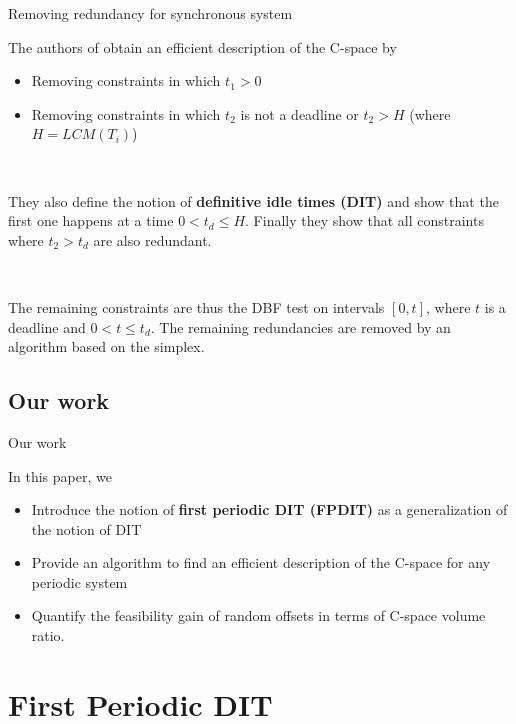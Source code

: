 \documentclass{beamer}
\begin{document}
    \begin{frame}{Removing redundancy for synchronous system}

    The authors of \cite{george2009characterization} obtain an efficient description of the C-space by
    \begin{itemize}
        \item Removing constraints in which $t_1 > 0$
        \item Removing constraints in which $t_2$ is not a deadline or $t_2 > H$ (where $H = LCM(T_i)$)
    \end{itemize}

    ~\\
    \pause

    They also define the notion of \textbf{definitive idle times (DIT)} and show that the first one happens at a time $0 < t_d \leqslant H$. Finally they show that all constraints where $t_2 > t_d$ are also redundant.

    ~\\
    \pause

    The remaining constraints are thus the DBF test on intervals $[0, t]$, where $t$ is a deadline and $0 < t \leqslant t_d$. The remaining redundancies are removed by an algorithm based on the simplex.

    \end{frame}

	\subsection{Our work}

	\begin{frame}{Our work}

	In this paper, we
    \begin{itemize}
        \item Introduce the notion of \textbf{first periodic DIT (FPDIT)} as a generalization of the notion of DIT
        \item Provide an algorithm to find an efficient description of the C-space for any periodic system
        \item Quantify the feasibility gain of random offsets in terms of C-space volume ratio.
    \end{itemize}

	\end{frame}

\section{First Periodic DIT}
\end{document}
